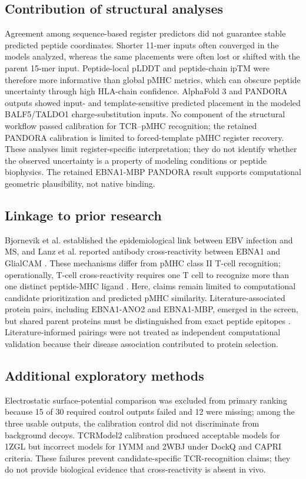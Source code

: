 \documentclass[11pt]{article}
\begin{document}
\subsection{Contribution of structural analyses}
Agreement among sequence-based register predictors did not guarantee stable predicted peptide coordinates. Shorter 11-mer inputs often converged in the models analyzed, whereas the same placements were often lost or shifted with the parent 15-mer input. Peptide-local pLDDT and peptide-chain ipTM were therefore more informative than global pMHC metrics, which can obscure peptide uncertainty through high HLA-chain confidence. AlphaFold 3 and PANDORA outputs showed input- and template-sensitive predicted placement in the modeled BALF5/TALDO1 charge-substitution inputs. No component of the structural workflow passed calibration for TCR--pMHC recognition; the retained PANDORA calibration is limited to forced-template pMHC register recovery. These analyses limit register-specific interpretation; they do not identify whether the observed uncertainty is a property of modeling conditions or peptide biophysics. The retained EBNA1-MBP PANDORA result supports computational geometric plausibility, not native binding.

\subsection{Linkage to prior research}
Bjornevik et al. established the epidemiological link between EBV infection and MS, and Lanz et al. reported antibody cross-reactivity between EBNA1 and GlialCAM \cite{bjornevik,lanz}. These mechanisms differ from pMHC class II T-cell recognition; operationally, T-cell cross-reactivity requires one T cell to recognize more than one distinct peptide-MHC ligand \cite{sewell}. Here, claims remain limited to computational candidate prioritization and predicted pMHC similarity. Literature-associated protein pairs, including EBNA1-ANO2 and EBNA1-MBP, emerged in the screen, but shared parent proteins must be distinguished from exact peptide epitopes \cite{thomas}. Literature-informed pairings were not treated as independent computational validation because their disease association contributed to protein selection.

\subsection{Additional exploratory methods}
Electrostatic surface-potential comparison was excluded from primary ranking because 15 of 30 required control outputs failed and 12 were missing; among the three usable outputs, the calibration control did not discriminate from background decoys. TCRModel2 calibration produced acceptable models for 1ZGL but incorrect models for 1YMM and 2WBJ under DockQ and CAPRI criteria. These failures prevent candidate-specific TCR-recognition claims; they do not provide biological evidence that cross-reactivity is absent in vivo.
\end{document}
